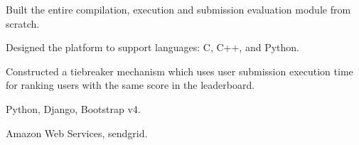 \begin{tightemize}
\item Built the entire compilation, execution and submission evaluation module from scratch.
\item Designed the platform to support languages: C, C++, and Python.
\item Constructed a tiebreaker mechanism which uses user submission execution time for ranking users with the same score in the leaderboard.
\item {} Python, Django, Bootstrap v4.
\item {} Amazon Web Services, sendgrid.
\end{tightemize}
\sectionsep